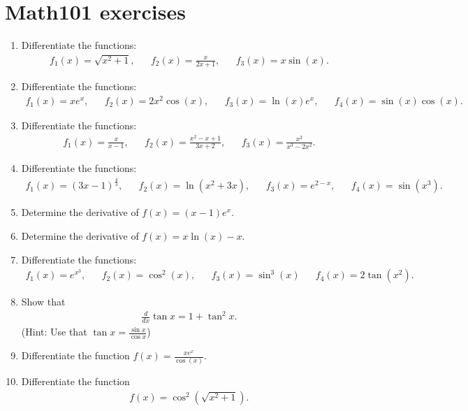 \newpage
\section{Math101 exercises}
\begin{enumerate}

	\item Differentiate the functions:
	\begin{align*}
	f_1(x)=\sqrt{x^2+1},&& f_2(x)=\frac{x}{2x+1},&& f_3(x)=x\sin(x).
	\end{align*}

	\item Differentiate the functions:
	\begin{align*}
	f_1(x)=xe^x,&& f_2(x)=2x^2\cos(x),&& f_3(x)=\ln(x)e^x,&& f_4(x)=\sin(x)\cos(x).
	\end{align*}

	\item Differentiate the functions:
	\begin{align*}
	f_1(x)=\frac{x}{x-1},&&f_2(x)=\frac{x^2-x+1}{3x+2},&&f_3(x)=\frac{x^2}{x^3-2x^2}.
	\end{align*}
	
	\item Differentiate the functions:
	\begin{align*}
	f_1(x)=(3x-1)^\frac{4}{3},&& f_2(x)=\ln(x^2+3x),&& f_3(x)=e^{2-x},&&f_4(x)=\sin(x^3).
	\end{align*}
	
	\item \label{it:diff24}Determine the derivative of $f(x)=(x-1)e^x$.
	
	
	\item \label{it:diff23}Determine the derivative of $f(x)=x\ln(x)-x$.
	
	\item Differentiate the functions:
	\begin{align*}
	f_1(x)=e^{x^3},&&f_2(x)=\cos^2(x),&&f_3(x)=\sin^3(x)&&f_4(x)=2\tan(x^2).
	\end{align*}
		
	\item\label{it:diff21} Show that 
	\begin{align*}
	\frac{d}{dx} \tan x= 1+\tan^2x.
	\end{align*}
	(Hint: Use that $\tan x=\frac{\sin x}{\cos x}$)

	\item Differentiate the function $f(x)=\frac{xe^x}{\cos(x)}$.
		
	\item Differentiate the function
	\begin{align*}
	f(x)=\cos^2(\sqrt{x^2+1}).
	\end{align*}
		

\end{enumerate}
